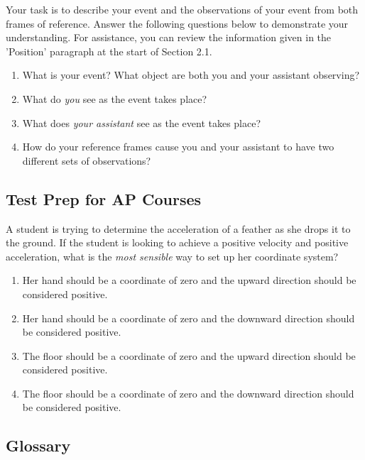 \documentclass[
]{book}
\providecommand{\tightlist}{%
  \setlength{\itemsep}{0pt}\setlength{\parskip}{0pt}}
\begin{document}
Your task is to describe your event and the observations of your event
from both frames of reference. Answer the following questions below to
demonstrate your understanding. For assistance, you can review the
information given in the 'Position' paragraph at the start of Section
2.1.

\begin{enumerate}
\def\labelenumi{\arabic{enumi}.}
\tightlist
\item
  What is your event? What object are both you and your assistant
  observing?
\item
  What do \emph{you} see as the event takes place?
\item
  What does \emph{your assistant} see as the event takes place?
\item
  How do your reference frames cause you and your assistant to have
  two different sets of observations?
\end{enumerate}

\hypertarget{fs-id1368980}{}
\hypertarget{test-prep-for-ap-courses-1}{%
\subsection{Test Prep for AP Courses}\label{test-prep-for-ap-courses-1}}

\hypertarget{fs-id1890618}{}
\leavevmode{}%
A student is trying to determine the acceleration of a feather as she
drops it to the ground. If the student is looking to achieve a positive
velocity and positive acceleration, what is the \emph{most sensible} way to
set up her coordinate system?

\begin{enumerate}
\def\labelenumi{\alph{enumi}.}
\tightlist
\item
  Her hand should be a coordinate of zero and the upward direction
  should be considered positive.
\item
  Her hand should be a coordinate of zero and the downward direction
  should be considered positive.
\item
  The floor should be a coordinate of zero and the upward direction
  should be considered positive.
\item
  The floor should be a coordinate of zero and the downward direction
  should be considered positive.
\end{enumerate}

\hypertarget{glossary-1}{%
\subsection{Glossary}\label{glossary-1}}
\end{document}
